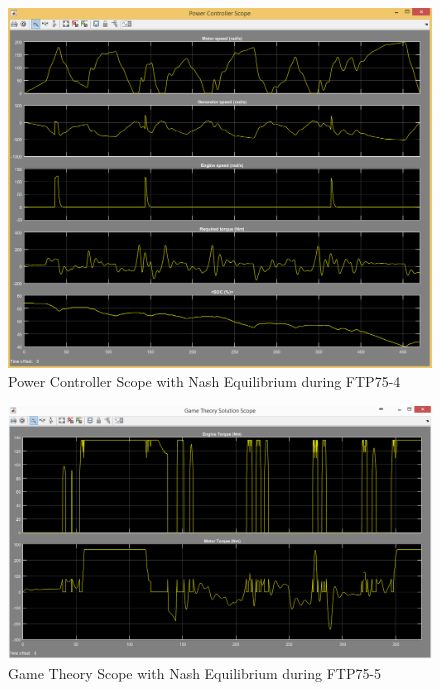 \begin{figure}[h]
\centering
\includegraphics[scale=0.4]{figures/NashEquilibrium/FTP75-4/powerController15Juni}
\caption{Power Controller Scope with Nash Equilibrium during FTP75-4}
\label{fig:pcne4}
\end{figure}



\begin{figure}[h]
\centering
\includegraphics[scale=0.4]{figures/NashEquilibrium/FTP75-5/gameTheory16Juni}
\caption{Game Theory Scope with Nash Equilibrium during FTP75-5}
\label{fig:gtne5}
\end{figure}

